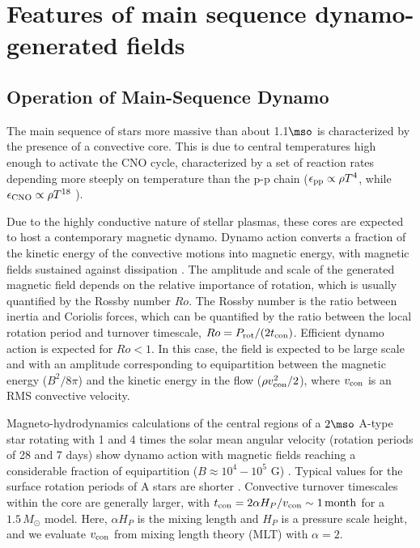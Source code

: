 \section{Features of main sequence dynamo-generated fields}

\subsection{Operation of Main-Sequence Dynamo}

The main sequence of stars more massive than about 1.1$\mso$ is characterized by the presence of a convective core.
This is due to central temperatures high enough to activate the CNO cycle, characterized by a set of reaction rates depending more steeply on temperature than the p-p chain ($\epsilon_{\rm pp}\propto \rho T^{4}$, while $\epsilon_{\rm CNO}\propto \rho T^{18}$ ).

Due to the highly conductive nature of stellar plasmas, 
these cores are expected to host a contemporary magnetic dynamo. Dynamo action converts a fraction of the kinetic energy 
of the convective motions into magnetic energy, with magnetic fields sustained against dissipation  \citep[see e.g.,][]{Brandenburg_2005}. The amplitude and scale of the generated magnetic field depends on the relative importance of rotation, which is usually quantified by the Rossby number $Ro$. The Rossby number is the ratio between inertia and Coriolis forces, which can be quantified by the ratio between the local rotation period and turnover timescale, $Ro = P_{\rm rot}/(2 t_{\rm con})$. 
Efficient dynamo action is expected for $Ro<1$. In this case, the field is expected to be large scale and with an amplitude corresponding to equipartition between the magnetic energy ($B^2/8\pi$) and the kinetic energy in the flow ($\rho v^2_{\rm con}/2$), where $v_{\rm con}$ is an RMS convective velocity.

Magneto-hydrodynamics calculations of the central regions of a $2\mso$ A-type star rotating with 
1 and 4 times the solar mean angular velocity (rotation periods of 28 and 7 days) show dynamo action 
with magnetic fields reaching a considerable fraction of equipartition ($B \approx 10^4-10^5$ G) \citep{Brun_2005}. Typical values for the surface  rotation periods of A stars are shorter \citep[about 1 day, see e.g.]{Zorec_2012}. Convective turnover timescales within the core are generally larger, with $t_{\rm con} = 2 \alpha H_P/v_{\rm con} \sim 1 \, {\rm month}$ for a $1.5 \, M_\odot$ model. Here, $\alpha H_P$ is the mixing length and $H_P$ is a pressure scale height, and we evaluate $v_{\rm con}$ from mixing length theory (MLT) with $\alpha = 2$. 


